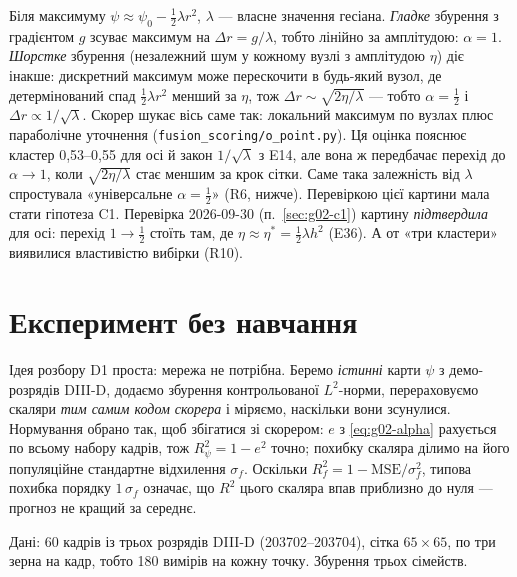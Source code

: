 \begin{derivation}
Біля максимуму $\psi\approx\psi_0-\tfrac12\lambda r^2$, $\lambda$ --- власне значення
гесіана. \emph{Гладке} збурення з градієнтом $g$ зсуває максимум на $\Delta r=g/\lambda$,
тобто лінійно за амплітудою: $\alpha=1$. \emph{Шорстке} збурення (незалежний шум у
кожному вузлі з амплітудою $\eta$) діє інакше: дискретний максимум може перескочити в
будь-який вузол, де детермінований спад $\tfrac12\lambda r^2$ менший за $\eta$, тож
$\Delta r\sim\sqrt{2\eta/\lambda}$ --- тобто $\alpha=\tfrac12$ і $\Delta r\propto1/\sqrt\lambda$.
Скорер шукає вісь саме так: локальний максимум по вузлах плюс параболічне уточнення
(\texttt{fusion\_scoring/o\_point.py}). Ця оцінка пояснює кластер 0,53--0,55 для осі й
закон $1/\sqrt\lambda$ з E14, але вона ж передбачає перехід до $\alpha\to1$, коли
$\sqrt{2\eta/\lambda}$ стає меншим за крок сітки. Саме така залежність від $\lambda$
спростувала «універсальне $\alpha=\tfrac12$» (R6, нижче). Перевіркою цієї картини мала
стати гіпотеза C1. Перевірка 2026-09-30 (п.~\ref{sec:g02-c1}) картину \emph{підтвердила} для
осі: перехід $1\to\tfrac12$ стоїть там, де $\eta\approx\eta^{*}=\tfrac12\lambda h^2$ (E36). А от
«три кластери» виявилися властивістю вибірки (R10).
\end{derivation}

\section{Експеримент без навчання}\label{sec:g02-method}

Ідея розбору D1 проста: мережа не потрібна. Беремо \emph{істинні} карти $\psi$ з
демо-розрядів DIII-D, додаємо збурення контрольованої $L^2$-норми, перераховуємо скаляри
\emph{тим самим кодом скорера} і міряємо, наскільки вони зсунулися. Нормування обрано так,
щоб збігатися зі скорером: $e$ з \eqref{eq:g02-alpha} рахується по всьому набору кадрів,
тож $R^2_\psi=1-e^2$ точно; похибку скаляра ділимо на його популяційне стандартне
відхилення $\sigma_f$. Оскільки $R^2_f=1-\mathrm{MSE}/\sigma_f^2$, типова похибка порядку
$1\,\sigma_f$ означає, що $R^2$ цього скаляра впав приблизно до нуля --- прогноз не кращий
за середнє.

Дані: 60 кадрів із трьох розрядів DIII-D (203702--203704), сітка $65\times65$, по три
зерна на кадр, тобто 180 вимірів на кожну точку. Збурення трьох сімейств.


